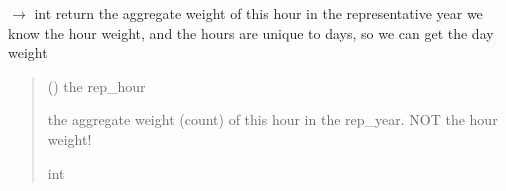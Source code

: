 \documentclass[letterpaper,10pt,english]{sphinxmanual}
\begin{document}
\begin{fulllineitems}
\label{\detokenize{src.models.electricity.scripts.utilities:src.models.electricity.scripts.utilities.annual_count}}
\pysigstartsignatures
\pysiglinewithargsret
{}
{\sphinxparamcomma {}}
{{ $\rightarrow$ int}}
\pysigstopsignatures
\sphinxAtStartPar
return the aggregate weight of this hour in the representative year
we know the hour weight, and the hours are unique to days, so we can
get the day weight
\begin{quote}\begin{description}
\sphinxAtStartPar
{} () \textendash{} the rep\_hour

\sphinxAtStartPar
the aggregate weight (count) of this hour in the rep\_year.  NOT the hour weight!

\sphinxAtStartPar
int

\end{description}\end{quote}

\end{fulllineitems}

\end{document}
